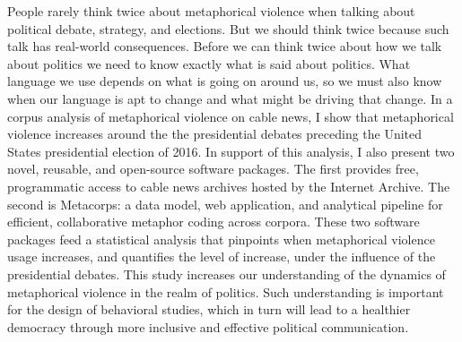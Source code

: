 People rarely think twice about metaphorical violence when talking about 
political debate, strategy, and elections. But we should think twice because
such talk has real-world consequences. Before we can think twice about how we
talk about politics we need to know exactly what is said about politics. What language
we use depends on what is going on around us, so we must also know when our
language is apt to change and what might be driving that change. In a corpus analysis
of metaphorical violence on cable news, I show that metaphorical violence increases
around the the presidential debates 
preceding the United States presidential election of 2016. In support of this
analysis, I also present two novel, reusable, and open-source software packages. 
The first provides free, programmatic access to cable news archives hosted
by the Internet Archive. The second is Metacorps: a data model, web application,
and analytical pipeline for efficient, collaborative metaphor coding across corpora. 
These two software packages feed a statistical analysis that pinpoints when metaphorical
violence usage increases, and quantifies the level of increase, under the
influence of the presidential debates. This study increases our understanding of the
dynamics of metaphorical violence in the realm of politics. Such understanding
is important for the design of behavioral studies, 
which in turn will lead to a healthier democracy through more inclusive and 
effective political communication.
